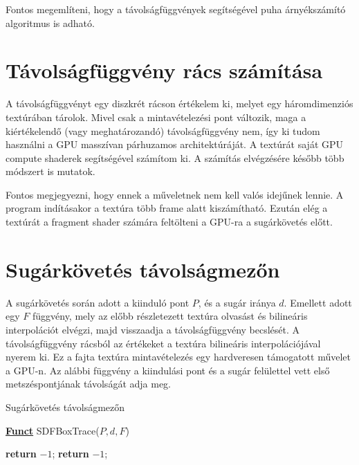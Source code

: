 Fontos megemlíteni, hogy a távolságfüggvények segítségével puha árnyékszámító algoritmus is adható. \cite{AreaLights}


\section{Távolságfüggvény rács számítása}

A távolságfüggvényt egy diszkrét rácson értékelem ki, melyet egy háromdimenziós textúrában tárolok. Mivel csak a mintavételezési pont változik, maga a kiértékelendő (vagy meghatározandó) távolságfüggvény nem, így ki tudom használni a GPU masszívan párhuzamos architektúráját. A textúrát saját GPU compute shaderek segítségével számítom ki. A számítás elvégzésére később több módszert is mutatok. 

Fontos megjegyezni, hogy ennek a műveletnek nem kell valós idejűnek lennie. A program indításakor a textúra több frame alatt kiszámítható. Ezután elég a textúrát a fragment shader számára feltölteni a GPU-ra a sugárkövetés előtt.


\section{Sugárkövetés távolságmezőn}

A sugárkövetés során adott a kiinduló pont $P$, és a sugár iránya $d$. Emellett adott egy $F$ függvény, mely az előbb részletezett textúra olvasást és bilineáris interpolációt elvégzi, majd visszaadja a távolságfüggvény becslését. A távolságfüggvény rácsból az értékeket a textúra bilineáris interpolációjával nyerem ki. Ez a fajta textúra mintavételezés egy hardveresen támogatott művelet a GPU-n. Az alábbi függvény a kiindulási pont és a sugár felülettel vett első metszéspontjának távolságát adja meg.

\begin{algorithm}[H]
	\caption{Sugárkövetés távolságmezőn}
	\label{alg:ibb}
	\textbf{\underline{Funct}} SDFBoxTrace($P,d,F$)
	\begin{algorithmic}[1] %
		 
		\EndIf
		 
		\EndIf
		                     
		 
		\EndIf
		\State \textbf{return} $-1$; 
		\EndIf
		\EndFor
		\State \textbf{return} $-1$; 
	\end{algorithmic}
\end{algorithm}


